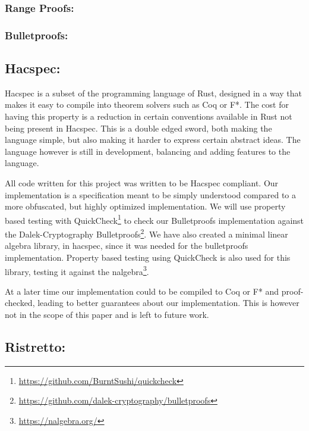 \documentclass{article}
\begin{document}
\subsubsection{Range Proofs:}

\subsubsection{Bulletproofs:}


\subsection{Hacspec:} \label{Hacspec}

Hacspec is a subset of the programming language of Rust, designed in a way that makes it easy to compile into theorem solvers such as Coq or F*. The cost for having this property is a reduction in certain conventions available in Rust not being present in Hacspec. This is a double edged sword, both making the language simple, but also making it harder to express certain abstract ideas. The language however is still in development, balancing and adding features to the language.

All code written for this project was written to be Hacspec compliant. Our implementation is a specification meant to be simply understood compared to a more obfuscated, but highly optimized implementation. We will use property based testing with QuickCheck\footnote{\url{https://github.com/BurntSushi/quickcheck}} to check our Bulletproofs implementation against the Dalek-Cryptography Bulletproofs\footnote{\url{https://github.com/dalek-cryptography/bulletproofs}}. We have also created a minimal linear algebra library, in hacspec, since it was needed for the bulletproofs implementation. Property based testing using QuickCheck is also used for this library, testing it against the nalgebra\footnote{\url{https://nalgebra.org/}}.

At a later time our implementation could to be compiled to Coq or F* and proof-checked, leading to better guarantees about our implementation. This is however not in the scope of this paper and is left to future work. %

\subsection{Ristretto:} \label{ristretto}
\end{document}
